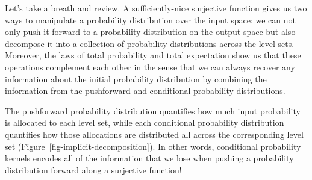 \documentclass[
  letterpaper,
  DIV=11,
  numbers=noendperiod]{scrartcl}
\begin{document}
Let's take a breath and review. A sufficiently-nice surjective function
gives us two ways to manipulate a probability distribution over the
input space: we can not only push it forward to a probability
distribution on the output space but also decompose it into a collection
of probability distributions across the level sets. Moreover, the laws
of total probability and total expectation show us that these operations
complement each other in the sense that we can always recover any
information about the initial probability distribution by combining the
information from the pushforward and conditional probability
distributions.

The pushforward probability distribution quantifies how much input
probability is allocated to each level set, while each conditional
probability distribution quantifies how those allocations are
distributed all across the corresponding level set
(Figure~\ref{fig-implicit-decomposition}). In other words, conditional
probability kernels encodes all of the information that we lose when
pushing a probability distribution forward along a surjective function!
\end{document}
